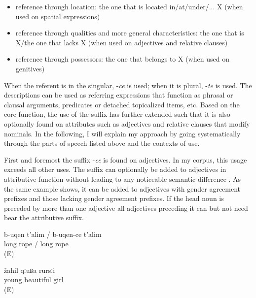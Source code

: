 \begin{itemize}
\item reference through location: the one that is located in/at/under/... X (when used on spatial expressions)
\item reference through qualities and more general characteristics: the one that is X\slash the one that lacks X (when used on adjectives and relative clauses)
\item reference through possessors: the one that belongs to X (when used on genitives)
\end{itemize}

When the referent is in the singular, -\textit{ce} is used; when it is plural, -\textit{te} is used. The descriptions can be used as referring expressions that function as phrasal or clausal arguments, predicates or detached topicalized items, etc. Based on the core function, the use of the suffix has further extended such that it is also optionally found on attributes such as adjectives and relative clauses that modify nominals. In the following, I will explain my approach by going systematically through the parts of speech listed above and the contexts of use.

First and foremost the suffix -\textit{ce} is found on adjectives. In my corpus, this usage exceeds all other uses. The suffix can optionally be added to adjectives in attributive function without leading to any noticeable semantic difference . As the same example shows, it can be added to adjectives with gender agreement prefixes and those lacking gender agreement prefixes. If the head noun is preceded by more than one adjective all adjectives preceding it can but not need bear the attributive suffix.
%
\begin{exe}
	\ex	\label{ex:a long rope minor}
	\gll	b-uqen	t'alim	/	b-uqen-ce	t'alim\\
		long	rope		/	long	rope\\
	\glt	{} (E)

	\ex	\label{ex:‎‎a young, beautiful girl minor}
	\gll	žahil	qːuʁa	rursːi\\
		young	beautiful	girl\\
	\glt	{} (E)

	\ex	\label{ex:‎‎a young, beautiful girl minor second}
	\begin{xlist}
		\ex	{}		\label{ex:‎‎a young, beautiful girl minor@A}
		\ex	{}	\label{ex:‎‎a young, beautiful girl minor@B}
		\ex	{}	\label{ex:‎‎a young, beautiful girl minor@C}
	\end{xlist}
\end{exe}

